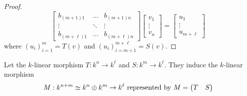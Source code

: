 \begin{proof}
\[\begin{bmatrix}
  b_{(m+1) 1} &\dots &b_{(m+1) n} \\
  \vdots &\ddots &\vdots \\
  b_{(m+\ell) 1} &\dots & b_{(m+\ell) n}
\end{bmatrix}
\begin{bmatrix}
  v_1 \\ \vdots \\ v_n
\end{bmatrix}
=
\begin{bmatrix} u_1 \\ \vdots \\ u_{m+\ell} \end{bmatrix}
\]
where \((u_i)_{i=1}^m = T(v) \) and \((u_i)_{i=m+1}^{m+\ell} = S(v)\).
\end{proof}

\begin{proposition}
Let the \(k\)-linear morphism \(T : k^n \to k^\ell\) and \(S : k^m \to
k^\ell\). They induce the \(k\)-linear morphism
\[
M : k^{n+m} \simeq k^n \oplus k^m \to k^\ell \text{ represented by }
M = \begin{pmatrix} T &S \end{pmatrix}
\]
\end{proposition}

